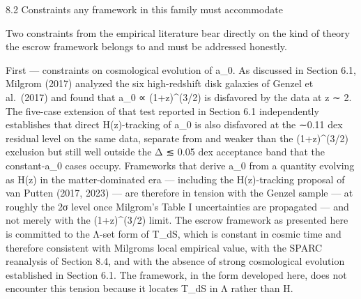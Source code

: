 \documentclass[11pt]{article}
\begin{document}
8.2 Constraints any framework in this family must accommodate

Two constraints from the empirical literature bear directly on the kind of theory the escrow framework belongs to and must be addressed honestly.

First --- constraints on cosmological evolution of a\_0. As discussed in Section 6.1, Milgrom (2017) analyzed the six high-redshift disk galaxies of Genzel et al.~(2017) and found that a\_0 ∝ (1+z)\^{}(3/2) is disfavored by the data at z ∼ 2. The five-case extension of that test reported in Section 6.1 independently establishes that direct H(z)-tracking of a\_0 is also disfavored at the ∼0.11 dex residual level on the same data, separate from and weaker than the (1+z)\^{}(3/2) exclusion but still well outside the \textbar Δ\textbar{} ≲ 0.05 dex acceptance band that the constant-a\_0 cases occupy. Frameworks that derive a\_0 from a quantity evolving as H(z) in the matter-dominated era --- including the H(z)-tracking proposal of van Putten (2017, 2023) --- are therefore in tension with the Genzel sample --- at roughly the 2σ level once Milgrom's Table I uncertainties are propagated --- and not merely with the (1+z)\^{}(3/2) limit. The escrow framework as presented here is committed to the Λ-set form of T\_dS, which is constant in cosmic time and therefore consistent with Milgrom\textquotesingle s local empirical value, with the SPARC reanalysis of Section 8.4, and with the absence of strong cosmological evolution established in Section 6.1. The framework, in the form developed here, does not encounter this tension because it locates T\_dS in Λ rather than H.
\end{document}
